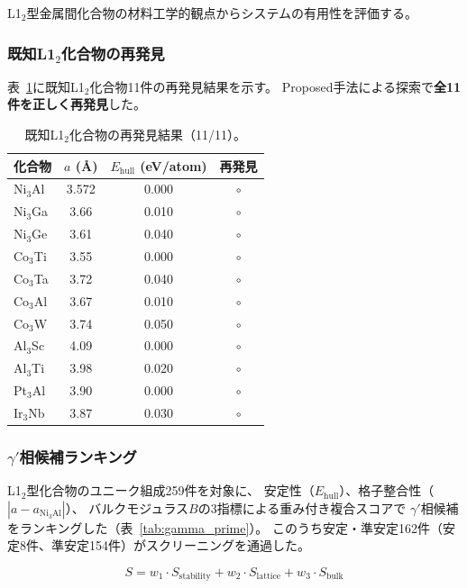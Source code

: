 \documentclass[5p,twocolumn]{elsarticle}
\begin{document}
L1$_2$型金属間化合物の材料工学的観点からシステムの有用性を評価する。

\subsubsection{既知L1$_2$化合物の再発見}

表~\ref{tab:known_l12}に既知L1$_2$化合物11件の再発見結果を示す。
Proposed手法による探索で\textbf{全11件を正しく再発見}した。

\begin{table}[htbp]
  \centering
  \caption{既知L1$_2$化合物の再発見結果（11/11）。}
  \label{tab:known_l12}
  \small
  \begin{tabular}{lccc}
    \toprule
    化合物 & $a$ (\AA) & $E_\text{hull}$ (eV/atom) & 再発見 \\
    \midrule
    Ni$_3$Al & 3.572 & 0.000 & $\circ$ \\
    Ni$_3$Ga & 3.66 & 0.010 & $\circ$ \\
    Ni$_3$Ge & 3.61 & 0.040 & $\circ$ \\
    Co$_3$Ti & 3.55 & 0.000 & $\circ$ \\
    Co$_3$Ta & 3.72 & 0.040 & $\circ$ \\
    Co$_3$Al & 3.67 & 0.010 & $\circ$ \\
    Co$_3$W & 3.74 & 0.050 & $\circ$ \\
    Al$_3$Sc & 4.09 & 0.000 & $\circ$ \\
    Al$_3$Ti & 3.98 & 0.020 & $\circ$ \\
    Pt$_3$Al & 3.90 & 0.000 & $\circ$ \\
    Ir$_3$Nb & 3.87 & 0.030 & $\circ$ \\
    \bottomrule
  \end{tabular}
\end{table}

\subsubsection{$\gamma'$相候補ランキング}

L1$_2$型化合物のユニーク組成259件を対象に、
安定性（$E_\text{hull}$）、格子整合性（$|a - a_{\text{Ni}_3\text{Al}}|$）、
バルクモジュラス$B$の3指標による重み付き複合スコアで
$\gamma'$相候補をランキングした（表~\ref{tab:gamma_prime}）。
このうち安定・準安定162件（安定8件、準安定154件）がスクリーニングを通過した。

\begin{equation}
  S = w_1 \cdot S_\text{stability} + w_2 \cdot S_\text{lattice} + w_3 \cdot S_\text{bulk}
  \label{eq:composite_score}
\end{equation}
\end{document}
